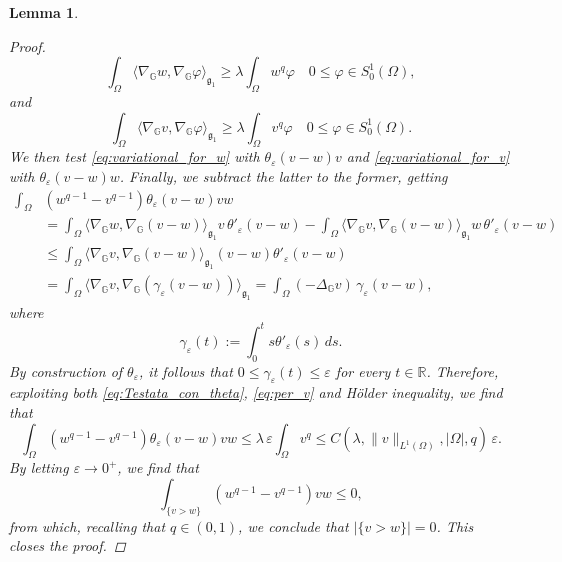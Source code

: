 \documentclass[11pt]{amsart}
\numberwithin{equation}{section} %
\newtheorem{lemma}[teo]{Lemma}
\theoremstyle{definition}
\begin{document}
\begin{lemma}
\begin{proof}
\begin{equation}
				\int_{\Omega}\langle \nabla_{\mathbb{G}}w, \nabla_{\mathbb{G}}\varphi \rangle_{\mathfrak{g}_1} \geq \lambda \int_{\Omega} w^q\varphi \quad 0\leq \varphi \in S^{1}_{0}(\Omega),
			\end{equation}
			\noindent and 
			\begin{equation}\label{eq:variational_for_v}
				\int_{\Omega}\langle \nabla_{\mathbb{G}}v, \nabla_{\mathbb{G}}\varphi \rangle_{\mathfrak{g}_1} \geq \lambda \int_{\Omega}v^q \varphi \quad 0\leq \varphi \in S^{1}_{0}(\Omega).
			\end{equation}
			We then test \eqref{eq:variational_for_w} with $\theta_{\varepsilon}(v-w) v$ and \eqref{eq:variational_for_v} with $\theta_{\varepsilon}(v-w) w$. Finally, we subtract the latter to the former, getting
			\begin{equation}\label{eq:Testata_con_theta}
			\begin{aligned}
			\int_{\Omega}&\left(w^{q-1}-v^{q-1} \right)\theta_{\varepsilon}(v-w)vw \\
			&= \int_{\Omega}\langle \nabla_{\mathbb{G}}w, \nabla_{\mathbb{G}}(v-w)\rangle_{\mathfrak{g}_1}v \, \theta'_{\varepsilon}(v-w) - \int_{\Omega}\langle \nabla_{\mathbb{G}}v, \nabla_{\mathbb{G}}(v-w)\rangle_{\mathfrak{g}_1}w \, \theta'_{\varepsilon}(v-w)\\
			&\leq \int_{\Omega}\langle \nabla_{\mathbb{G}}v,\nabla_{\mathbb{G}}(v-w)\rangle_{\mathfrak{g}_1} (v-w)\theta'_{\varepsilon}(v-w) \\
			&= \int_{\Omega}\langle \nabla_{\mathbb{G}}v, \nabla_{\mathbb{G}}(\gamma_{\varepsilon}(v-w))\rangle_{\mathfrak{g}_1} = \int_{\Omega}(-\Delta_{\mathbb{G}}v) \, \gamma_{\varepsilon}(v-w),
		\end{aligned}
		\end{equation}
			\noindent where 
			\begin{equation*}
				\gamma_{\varepsilon}(t):= \int_{0}^{t}s\theta'_{\varepsilon}(s)\, ds.
			\end{equation*}
			By construction of $\theta_{\varepsilon}$, it follows that $0\leq \gamma_{\varepsilon}(t)\leq \varepsilon$ for every $t\in \mathbb{R}$. Therefore, exploiting both \eqref{eq:Testata_con_theta}, \eqref{eq:per_v} and H\"{o}lder inequality, we find that
			\begin{equation}
					\int_{\Omega}\left(w^{q-1}-v^{q-1} \right)\theta_{\varepsilon}(v-w)vw \leq \lambda \, \varepsilon \int_{\Omega}v^q \leq C(\lambda, \|v\|_{L^{1}(\Omega)},|\Omega|,q)\,  \varepsilon.
			\end{equation}
			By letting $\varepsilon \to 0^+$, we find that
			\begin{equation*}
				\int_{\{v>w\}}\left(w^{q-1}-v^{q-1} \right)vw \leq 0,
			\end{equation*}
			\noindent from which, recalling that $q \in (0,1)$, we conclude that $|\{v>w\}|=0$. This closes the proof.
			\end{proof}
	\end{lemma}		
			
\end{document}
